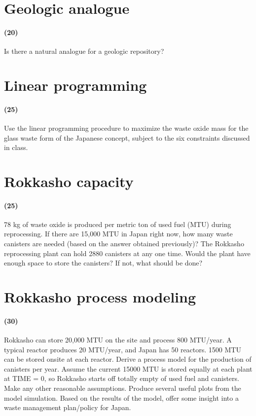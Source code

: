 \documentclass[11pt,a4paper]{article}
\begin{document}
\newpage

\section{Geologic analogue}
\paragraph*{(20)}
Is there a natural analogue for a geologic repository? 





\newpage

\section{Linear programming}
\paragraph*{(25)}
Use the linear programming procedure to maximize the waste oxide mass for the glass waste form of the Japanese concept, subject to the six constraints discussed in class.





\newpage

\section{Rokkasho capacity}
\paragraph*{(25)}
78 kg of waste oxide is produced per metric ton of used fuel (MTU) during reprocessing. If there are 15,000 MTU in Japan right now, how many waste canisters are needed (based on the answer obtained previously)? The Rokkasho reprocessing plant can hold 2880 canisters at any one time. Would the plant have enough space to store the canisters? If not, what should be done? 





\newpage

\section{Rokkasho process modeling}
\paragraph*{(30)}
Rokkasho can store 20,000 MTU on the site and process 800 MTU/year. A typical reactor produces 20 MTU/year, and Japan has 50 reactors. 1500 MTU can be stored onsite at each reactor. Derive a process model for the production of canisters per year. Assume the current 15000 MTU is stored equally at each plant at TIME = 0, so Rokkasho starts off totally empty of used fuel and canisters. Make any other reasonable assumptions. Produce several useful plots from the model simulation. Based on the results of the model, offer some insight into a waste management plan/policy for Japan. 
\end{document}
